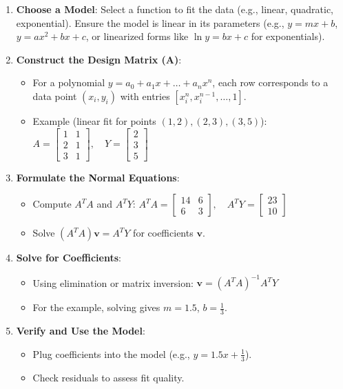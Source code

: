 \documentclass[11pt]{article}
\providecommand{\tightlist}{%
      \setlength{\itemsep}{0pt}\setlength{\parskip}{0pt}}
\begin{document}
\begin{enumerate}
\def\labelenumi{\arabic{enumi}.}
\item
  \textbf{Choose a Model}: Select a function to fit the data (e.g.,
  linear, quadratic, exponential). Ensure the model is linear in its
  parameters (e.g., \(y = mx + b\), \(y = ax^2 + bx + c\), or linearized
  forms like \(\ln y = bx + c\) for exponentials).
\item
  \textbf{Construct the Design Matrix (A)}:

  \begin{itemize}
  \tightlist
  \item
    For a polynomial \(y = a_0 + a_1x + \dots + a_nx^n\), each row
    corresponds to a data point \((x_i, y_i)\) with entries
    \([x_i^n, x_i^{n-1}, \dots, 1]\).
  \item
    Example (linear fit for points \((1,2), (2,3), (3,5)\)):
    \(A = \begin{bmatrix} 1 & 1 \\ 2 & 1 \\ 3 & 1 \end{bmatrix}, \quad Y = \begin{bmatrix} 2 \\ 3 \\ 5 \end{bmatrix}\)
  \end{itemize}
\item
  \textbf{Formulate the Normal Equations}:

  \begin{itemize}
  \tightlist
  \item
    Compute \(A^T A\) and \(A^T Y\):
    \(A^T A = \begin{bmatrix} 14 & 6 \\ 6 & 3 \end{bmatrix}, \quad A^T Y = \begin{bmatrix} 23 \\ 10 \end{bmatrix}\)
  \item
    Solve \((A^T A) \mathbf{v} = A^T Y\) for coefficients
    \(\mathbf{v}\).
  \end{itemize}
\item
  \textbf{Solve for Coefficients}:

  \begin{itemize}
  \tightlist
  \item
    Using elimination or matrix inversion:
    \(\mathbf{v} = (A^T A)^{-1} A^T Y\)
  \item
    For the example, solving gives \(m = 1.5\), \(b = \frac{1}{3}\).
  \end{itemize}
\item
  \textbf{Verify and Use the Model}:

  \begin{itemize}
  \tightlist
  \item
    Plug coefficients into the model (e.g., \(y = 1.5x + \frac{1}{3}\)).
  \item
    Check residuals to assess fit quality.
  \end{itemize}
\end{enumerate}
\end{document}
